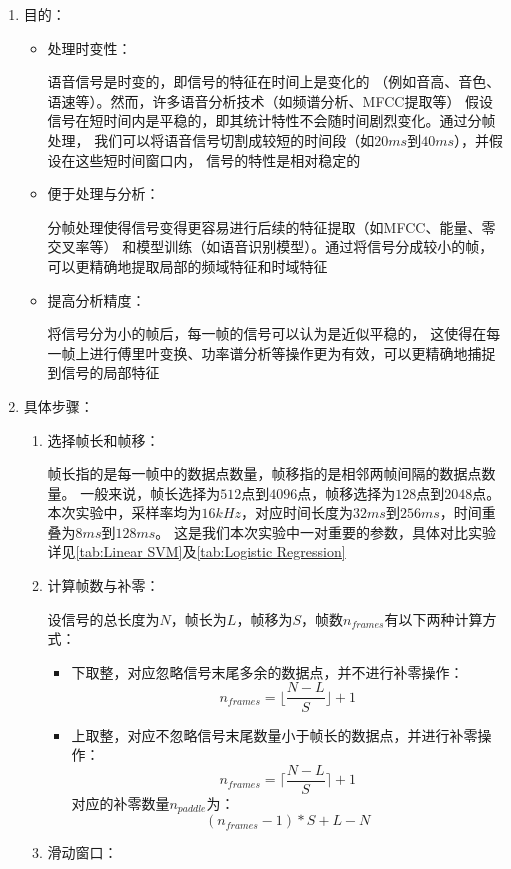\documentclass[a4paper]{article}
\begin{document}
\begin{enumerate}
  \item 
  {
    目的：
    \begin{itemize}
      \item 处理时变性：

      语音信号是时变的，即信号的特征在时间上是变化的
      （例如音高、音色、语速等）。然而，许多语音分析技术（如频谱分析、MFCC提取等）
      假设信号在短时间内是平稳的，即其统计特性不会随时间剧烈变化。通过分帧处理，
      我们可以将语音信号切割成较短的时间段（如$20ms$到$40ms$），并假设在这些短时间窗口内，
      信号的特性是相对稳定的
      \item 便于处理与分析：
  
      分帧处理使得信号变得更容易进行后续的特征提取（如MFCC、能量、零交叉率等）
      和模型训练（如语音识别模型）。通过将信号分成较小的帧，可以更精确地提取局部的频域特征和时域特征
      \item 提高分析精度：
  
      将信号分为小的帧后，每一帧的信号可以认为是近似平稳的，
      这使得在每一帧上进行傅里叶变换、功率谱分析等操作更为有效，可以更精确地捕捉到信号的局部特征
    \end{itemize}
  }
  \item
  {
    具体步骤：
    \begin{enumerate}
      \item 选择帧长和帧移：

      帧长指的是每一帧中的数据点数量，帧移指的是相邻两帧间隔的数据点数量。
      一般来说，帧长选择为$512$点到$4096$点，帧移选择为$128$点到$2048$点。
      本次实验中，采样率均为$16kHz$，对应时间长度为$32ms$到$256ms$，时间重叠为$8ms$到$128ms$。
      这是我们本次实验中一对重要的参数，具体对比实验详见\ref{tab:Linear SVM}及\ref{tab:Logistic Regression}
      \item 计算帧数与补零：
  
      设信号的总长度为$N$，帧长为$L$，帧移为$S$，帧数$n_{frames}$有以下两种计算方式：
      \begin{itemize}
        \item 下取整，对应忽略信号末尾多余的数据点，并不进行补零操作：
        \begin{equation}
          n_{frames} = \lfloor \frac{N - L}{S} \rfloor + 1
          \label{eq:floor}
        \end{equation}
        \item 上取整，对应不忽略信号末尾数量小于帧长的数据点，并进行补零操作：
        \begin{equation}
          n_{frames} = \lceil \frac{N - L}{S} \rceil + 1
          \label{eq:ceil}
        \end{equation}
        对应的补零数量$n_{paddle}$为：
        \begin{equation}
          (n_{frames} - 1) * S + L - N
        \end{equation}
      \end{itemize}
      \item 滑动窗口：


\end{enumerate}}
\end{enumerate}
\end{document}
